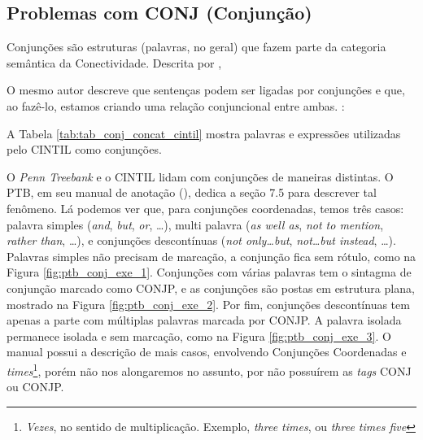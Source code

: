 \subsection{Problemas com CONJ (Conjunção)}
\label{subsec-cintil-conj}
Conjunções são estruturas (palavras, no geral) que fazem parte da categoria semântica da Conectividade. Descrita por ,
\begin{displayquote}
\end{displayquote}
O mesmo autor descreve que sentenças podem ser ligadas por conjunções e que, ao fazê-lo, estamos criando uma relação conjuncional entre ambas. :
\begin{displayquote}
\end{displayquote}
A Tabela 
\ref{tab:tab_conj_concat_cintil} mostra palavras e expressões utilizadas pelo CINTIL como conjunções.
% 
\begin{center}

\end{center}
O \textit{Penn Treebank} e o CINTIL lidam com conjunções de maneiras distintas. O PTB, em seu manual de anotação (\cite[p~117]{bracketing_ptb}), dedica a seção 7.5 para descrever tal fenômeno. Lá podemos ver que, para conjunções coordenadas, temos três casos: palavra simples (\textit{and}, \textit{but}, \textit{or}, \ldots), multi palavra (\textit{as well as}, \textit{not to mention}, \textit{rather than}, \ldots), e conjunções descontínuas (\textit{not only\ldots but}, \textit{not\ldots but instead}, \ldots). Palavras simples não precisam de marcação, a conjunção fica sem rótulo, como na Figura \ref{fig:ptb_conj_exe_1}. Conjunções com várias palavras tem o sintagma de conjunção marcado como CONJP, e as conjunções são postas em estrutura plana, mostrado na Figura \ref{fig:ptb_conj_exe_2}. Por fim, conjunções descontínuas tem apenas a parte com múltiplas palavras marcada por CONJP. A palavra isolada permanece isolada e sem marcação, como na Figura \ref{fig:ptb_conj_exe_3}. O manual possui a descrição de mais casos, envolvendo Conjunções Coordenadas e \textit{times}\footnote{\textit{Vezes}, no sentido de multiplicação. Exemplo, \textit{three times}, ou \textit{three times five}}, porém não nos alongaremos no assunto, por não possuírem as \textit{tags} CONJ ou CONJP.
